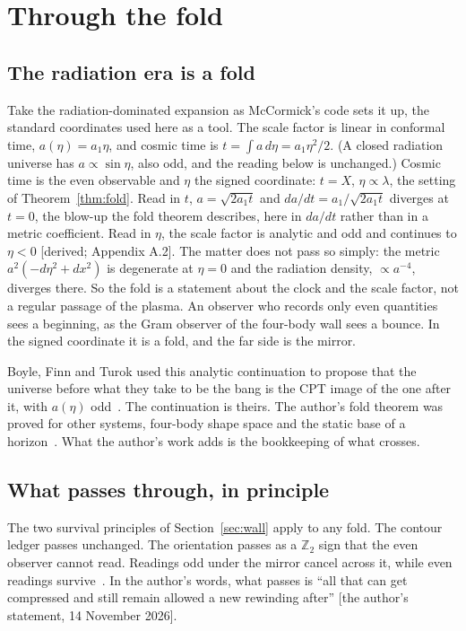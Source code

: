 \documentclass[11pt]{article}
\theoremstyle{definition}\newtheorem{hypothesis}{Hypothesis}\newtheorem{prediction}{Prediction}
\theoremstyle{remark}\newtheorem{remark}[theorem]{Remark}
\newcommand{\grade}[1]{\textsf{\small[#1]}}
\begin{document}
\section{Through the fold}\label{sec:fold}

\subsection{The radiation era is a fold}
Take the radiation-dominated expansion as McCormick's code sets it up, the standard coordinates used here as a tool. The scale factor is linear in conformal time, $a(\eta)=a_1\eta$, and cosmic time is $t=\int a\,d\eta=a_1\eta^2/2$. (A closed radiation universe has $a\propto\sin\eta$, also odd, and the reading below is unchanged.) Cosmic time is the even observable and $\eta$ the signed coordinate: $t=X$, $\eta\propto\lambda$, the setting of Theorem~\ref{thm:fold}. Read in $t$, $a=\sqrt{2a_1t}$ and $da/dt=a_1/\sqrt{2a_1t}$ diverges at $t=0$, the blow-up the fold theorem describes, here in $da/dt$ rather than in a metric coefficient. Read in $\eta$, the scale factor is analytic and odd and continues to $\eta<0$ \grade{derived; Appendix A.2}. The matter does not pass so simply: the metric $a^2(-d\eta^2+dx^2)$ is degenerate at $\eta=0$ and the radiation density, $\propto a^{-4}$, diverges there. So the fold is a statement about the clock and the scale factor, not a regular passage of the plasma. An observer who records only even quantities sees a beginning, as the Gram observer of the four-body wall sees a bounce. In the signed coordinate it is a fold, and the far side is the mirror.

Boyle, Finn and Turok used this analytic continuation to propose that the universe before what they take to be the bang is the CPT image of the one after it, with $a(\eta)$ odd~\cite{BFT,BFT2}. The continuation is theirs. The author's fold theorem was proved for other systems, four-body shape space and the static base of a horizon~\cite{BH}. What the author's work adds is the bookkeeping of what crosses.

\subsection{What passes through, in principle}
The two survival principles of Section~\ref{sec:wall} apply to any fold. The contour ledger passes unchanged. The orientation passes as a $\mathbb Z_2$ sign that the even observer cannot read. Readings odd under the mirror cancel across it, while even readings survive~\cite{BH}. In the author's words, what passes is ``all that can get compressed and still remain allowed a new rewinding after'' \grade{the author's statement, 14 November 2026}.
\end{document}
